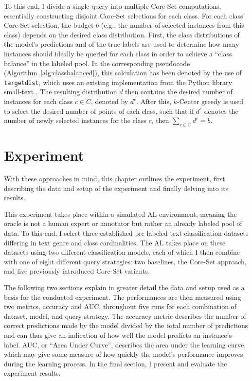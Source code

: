 \documentclass[english,bachelor,ul]{webisthesis} %
\begin{document}
To this end, I divide a single query into multiple Core-Set computations, essentially constructing disjoint Core-Set selections for each class. For each class' Core-Set selection, the budget $ b $ (e.g., the number of selected instances from this class) depends on the desired class distribution. First, the class distributions of the model's predictions and of the true labels are used to determine how many instances should ideally be queried for each class in order to achieve a ``class balance'' in the labeled pool. In the corresponding pseudocode (Algorithm~\ref{alg:classbalanced}), this calculation has been denoted by the use of \texttt{target\textunderscore dist}, which uses an existing implementation from the Python library small-text \citep{schroeder2023small-text}. The resulting distribution $ d $ then contains the desired number of instances for each class $ c \in C $, denoted by $ d^c $. After this, $k$-Center greedy is used to select the desired number of points of each class, such that if $ d^c $ denotes the number of newly selected instances for the class $ c $, then $ \sum_{c \in C} d^c = b $. 

\chapter{Experiment}

With these approaches in mind, this chapter outlines the experiment, first describing the data and setup of the experiment and finally delving into its results. 

This experiment takes place within a simulated AL environment, meaning the oracle is not a human expert or annotator but rather an already labeled pool of data. To this end, I select three established pre-labeled text classification datasets differing in text genre and class cardinalities. The AL takes place on these datasets using two different classification models, each of which I then combine with one of eight different query strategies: two baselines, the Core-Set approach, and five previously introduced Core-Set variants.

The following two sections explain in greater detail the data and setup used as a basis for the conducted experiment. The performances are then measured using two metrics, accuracy and AUC, throughout five runs for each combination of dataset, model, and query strategy. The accuracy metric describes the number of correct predictions made by the model divided by the total number of predictions and can thus give an indication of how well the model predicts an instance's label. AUC, or ``Area Under Curve'', describes the area under the learning curve, which may give some measure of how quickly the model's performance improves during the learning process. In the final section, I present and evaluate the experiment results.
\end{document}
